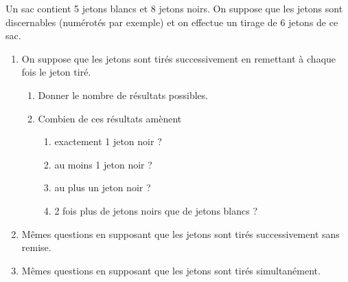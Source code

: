 \documentclass[../PolyS4.tex]{subfiles}
\begin{document}



Un sac contient 5 jetons blancs et 8 jetons noirs. On suppose que les jetons sont discernables (numérotés par exemple) et on effectue un tirage de 6 jetons de ce sac.
\begin{enumerate}
\item On suppose que les jetons sont tirés successivement en remettant à chaque fois le jeton tiré.
\begin{enumerate}
\item Donner le nombre de résultats possibles.
\item Combien de ces résultats amènent
\begin{enumerate}
\item exactement 1 jeton noir ?
\item au moins 1 jeton noir ?
\item au plus un jeton noir ?
\item 2 fois plus de jetons noirs que de jetons blancs ?
\end{enumerate}
\end{enumerate}
\item Mêmes questions en supposant que les jetons sont tirés successivement sans remise.
\item Mêmes questions en supposant que les jetons sont tirés simultanément.\\
\end{enumerate}


\end{document}
